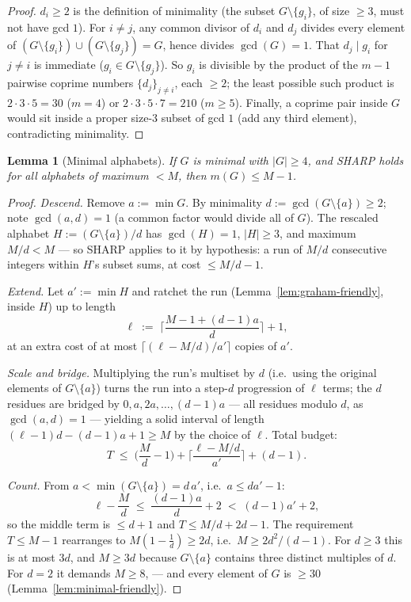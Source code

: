 \documentclass[11pt,reqno]{amsart}
\theoremstyle{plain}
\newtheorem{lemma}[theorem]{Lemma}
\theoremstyle{definition}
\theoremstyle{remark}
\begin{document}
\begin{proof}
$d_i \ge 2$ is the definition of minimality (the subset $G \setminus \{g_i\}$, of
size $\ge 3$, must not have gcd $1$). For $i \ne j$, any common divisor of $d_i$
and $d_j$ divides every element of $(G \setminus \{g_i\}) \cup (G \setminus
\{g_j\}) = G$, hence divides $\gcd(G) = 1$. That $d_j \mid g_i$ for $j \ne i$ is
immediate ($g_i \in G \setminus \{g_j\}$). So $g_i$ is divisible by the product of
the $m - 1$ pairwise coprime numbers $\{d_j\}_{j \ne i}$, each $\ge 2$; the least
possible such product is $2 \cdot 3 \cdot 5 = 30$ ($m = 4$) or $2 \cdot 3 \cdot 5
\cdot 7 = 210$ ($m \ge 5$). Finally, a coprime pair inside $G$ would sit inside a
proper size-$3$ subset of gcd $1$ (add any third element), contradicting
minimality.
\end{proof}

\begin{lemma}[Minimal alphabets]\label{lem:L4-friendly}
If $G$ is minimal with $|G| \ge 4$, and SHARP holds for all alphabets of maximum
$< M$, then $m(G) \le M - 1$.
\end{lemma}

\begin{proof}
\emph{Descend.} Remove $a := \min G$. By minimality $d := \gcd(G \setminus \{a\})
\ge 2$; note $\gcd(a, d) = 1$ (a common factor would divide all of $G$). The
rescaled alphabet $H := (G \setminus \{a\})/d$ has $\gcd(H) = 1$, $|H| \ge 3$, and
maximum $M/d < M$ --- so SHARP applies to it by hypothesis: a run of $M/d$
consecutive integers within $H$'s subset sums, at cost $\le M/d - 1$.

\emph{Extend.} Let $a' := \min H$ and ratchet the run
(Lemma~\ref{lem:graham-friendly}, inside $H$) up to length
\[
  \ell \;:=\; \Big\lceil \frac{M - 1 + (d-1)a}{d} \Big\rceil + 1 ,
\]
at an extra cost of at most $\lceil (\ell - M/d)/a' \rceil$ copies of $a'$.

\emph{Scale and bridge.} Multiplying the run's multiset by $d$ (i.e.\ using the
original elements of $G \setminus \{a\}$) turns the run into a step-$d$
progression of $\ell$ terms; the $d$ residues are bridged by $0, a, 2a, \dots,
(d-1)a$ --- all residues modulo $d$, as $\gcd(a,d) = 1$ --- yielding a solid
interval of length $(\ell - 1)d - (d-1)a + 1 \ge M$ by the choice of $\ell$. Total
budget:
\[
  T \;\le\; \Big( \frac Md - 1 \Big) + \Big\lceil \frac{\ell - M/d}{a'}
  \Big\rceil + (d - 1) .
\]

\emph{Count.} From $a < \min(G \setminus \{a\}) = d\,a'$, i.e.\ $a \le da' - 1$:
\[
  \ell - \frac Md \;\le\; \frac{(d-1)a}{d} + 2 \;<\; (d-1)a' + 2 ,
\]
so the middle term is $\le d + 1$ and $T \le M/d + 2d - 1$. The requirement $T
\le M - 1$ rearranges to $M(1 - \tfrac1d) \ge 2d$, i.e.\ $M \ge 2d^2/(d-1)$. For
$d \ge 3$ this is at most $3d$, and $M \ge 3d$ because $G \setminus \{a\}$
contains three distinct multiples of $d$. For $d = 2$ it demands $M \ge 8$, ---
and every element of $G$ is $\ge 30$ (Lemma~\ref{lem:minimal-friendly}).
\end{proof}
\end{document}
